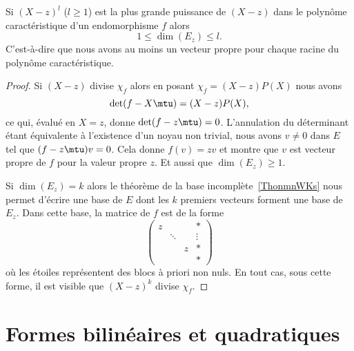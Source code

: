 \begin{proposition}\label{PropooBYZCooBmYLSc}
    Si \( (X-z)^l\) (\( l\geq 1\)) est la plus grande puissance de \( (X-z)\) dans le polynôme caractéristique d'un endomorphisme \( f\) alors
    \begin{equation}
        1\leq \dim(E_z)\leq l.
    \end{equation}
    C'est-à-dire que nous avons au moins un vecteur propre pour chaque racine du polynôme caractéristique.
\end{proposition}

\begin{proof}
    Si $(X-z)$ divise \( \chi_f\) alors en posant \( \chi_f=(X-z)P(X)\) nous avons
    \begin{equation}
        \det(f-X\mtu)=(X-z)P(X),
    \end{equation}
    ce qui, évalué en \( X=z\), donne \( \det(f-z\mtu)=0\). L'annulation du déterminant étant équivalente à l'existence d'un noyau non trivial, nous avons \( v\neq 0\) dans \( E\) tel que \( (f-z\mtu)v=0\). Cela donne \( f(v)=zv\) et montre que \( v\) est vecteur propre de \( f\) pour la valeur propre \( z\). Et aussi que \( \dim(E_z)\geq 1\).

    Si \( \dim(E_z)=k\) alors le théorème de la base incomplète~\ref{ThonmnWKs} nous permet d'écrire une base de \( E\) dont les \( k\) premiers vecteurs forment une base de \( E_z\). Dans cette base, la matrice de \( f\) est de la forme
    \begin{equation}
        \begin{pmatrix}
             z  &       &       &   *                 \\
                &   \ddots      &       &   \vdots    \\
                &       &   z   &   *                 \\
                &       &       &   *
         \end{pmatrix}
    \end{equation}
    où les étoiles représentent des blocs à priori non nuls. En tout cas, sous cette forme, il est visible que \( (X-z)^k\) divise \( \chi_f\).
\end{proof}


\section{Formes bilinéaires et quadratiques}

